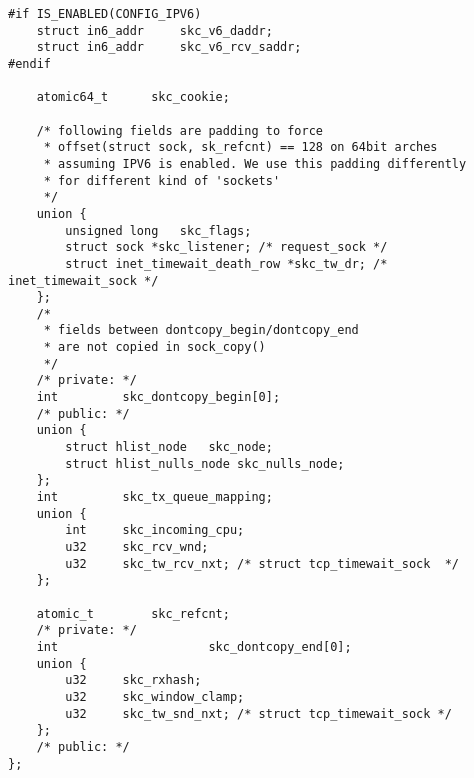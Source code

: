 \begin{verbatim}
#if IS_ENABLED(CONFIG_IPV6)
    struct in6_addr     skc_v6_daddr;
    struct in6_addr     skc_v6_rcv_saddr;
#endif

    atomic64_t      skc_cookie;

    /* following fields are padding to force
     * offset(struct sock, sk_refcnt) == 128 on 64bit arches
     * assuming IPV6 is enabled. We use this padding differently
     * for different kind of 'sockets'
     */
    union {
        unsigned long   skc_flags;
        struct sock *skc_listener; /* request_sock */
        struct inet_timewait_death_row *skc_tw_dr; /* inet_timewait_sock */
    };
    /*
     * fields between dontcopy_begin/dontcopy_end
     * are not copied in sock_copy()
     */
    /* private: */
    int         skc_dontcopy_begin[0];
    /* public: */
    union {
        struct hlist_node   skc_node;
        struct hlist_nulls_node skc_nulls_node;
    };
    int         skc_tx_queue_mapping;
    union {
        int     skc_incoming_cpu;
        u32     skc_rcv_wnd;
        u32     skc_tw_rcv_nxt; /* struct tcp_timewait_sock  */
    };

    atomic_t        skc_refcnt;
    /* private: */
    int                     skc_dontcopy_end[0];
    union {
        u32     skc_rxhash;
        u32     skc_window_clamp;
        u32     skc_tw_snd_nxt; /* struct tcp_timewait_sock */
    };
    /* public: */
};
\end{verbatim}
